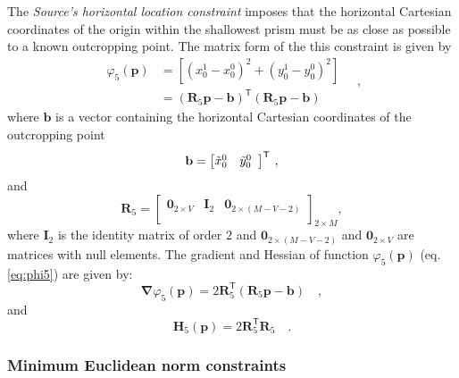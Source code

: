 The \textit{Source's horizontal location constraint} imposes that the horizontal Cartesian coordinates of the origin within 
the shallowest prism must be as close as possible to a known outcropping point. The matrix form of the this constraint is given by
\begin{equation}\label{eq:phi5}
\begin{split}
\varphi_{5}(\mathbf{p}) &= \left[\left(x_{0}^{1} - x_{0}^{0}\right)^2 + \left(y_{0}^{1} - y_0^0\right)^2\right] \\
&= \left(\mathbf{R}_{5} \mathbf{p} - \mathbf{b} \right)^{\mathsf{T}}
\left(\mathbf{R}_{5} \mathbf{p} - \mathbf{b}\right)
\end{split} \quad ,
\end{equation}
where $\mathbf{b}$ is a vector containing the horizontal Cartesian coordinates of the outcropping point 
\begin{equation}
\mathbf{b} = \left[ \begin{array}{@{}*{12}{c}@{}}
\tilde{x}_{0}^{0} & \tilde{y}_{0}^{0} \\
\end{array} \right]^{\mathsf{T}} \: ,
\label{eq:b-vector}
\end{equation}
and
\begin{equation}
\mathbf{R}_{5} = 
\begin{bmatrix}
\mathbf{0}_{2 \times V} & \mathbf{I}_{2} & \mathbf{0}_{2 \times (M-V-2)} \\
\end{bmatrix}_{2 \times M},
\label{eq:R5-matrix}
\end{equation}
where $\mathbf{I}_{2}$ is the identity matrix of order $2$ and $\mathbf{0}_{2 \times (M-V-2)}$ and 
$\mathbf{0}_{2 \times V}$ are matrices with null elements. The gradient and Hessian of function $\varphi_{5}(\mathbf{p})$ (eq. \ref{eq:phi5}) are given by:
\begin{equation}\label{eq:phi5_grad}
\boldsymbol{\nabla}\varphi_{5}(\mathbf{p}) = 2\mathbf{R}_{5}^{\mathsf{T}}
\left(\mathbf{R}_{5} \mathbf{p} - \mathbf{b}\right) \quad ,
\end{equation}
and
\begin{equation}\label{eq:phi5_hessian}
\mathbf{H}_{5}(\mathbf{p}) = 2 \mathbf{R}^{\mathsf{T}}_{5}\mathbf{R}_{5} \quad .
\end{equation}

\subsubsection{Minimum Euclidean norm constraints}

